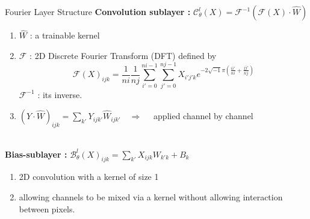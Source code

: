 \begin{frame}{Fourier Layer Structure}
    \textbf{Convolution sublayer : } \quad $\mathcal{C}_\theta^l(X)=\mathcal{F}^{-1}(\mathcal{F}(X)\cdot\hat{W})$ \quad
    \begin{minipage}{0.3\linewidth}
        \vspace{-15pt}
        \centering
    \end{minipage}
    \begin{enumerate}[\ding{217}]
        \item $\hat{W}$ : a trainable kernel
        \item $\mathcal{F}$ : 2D Discrete Fourier Transform (DFT) defined by
        \begin{equation*}
            \mathcal{F}(X)_{ijk}=\frac{1}{ni}\frac{1}{nj}\sum_{i'=0}^{ni-1}\sum_{j'=0}^{nj-1}X_{i'j'k}e^{-2\sqrt{-1}\pi\left(\frac{ii'}{ni}+\frac{jj'}{nj}\right)}
        \end{equation*}
        $\mathcal{F}^{-1}$ : its inverse.
        \item $(Y\cdot\hat{W})_{ijk}=\sum_{k'}Y_{ijk'}\hat{W}_{ijk'} \quad \Rightarrow \quad$ applied channel by channel
    \end{enumerate} \; \\
    \textbf{Bias-sublayer :} \quad  $\mathcal{B}_\theta^l(X)_{ijk}=\sum_{k'}X_{ijk}W_{k'k}+B_k$ \quad
    \begin{minipage}{0.3\linewidth}
        \vspace{-10pt}
    \end{minipage}
    \begin{enumerate}[\ding{217}]
        \item 2D convolution with a kernel of size 1
        \item allowing channels to be mixed via a kernel without allowing interaction between pixels.
    \end{enumerate}
\end{frame}


